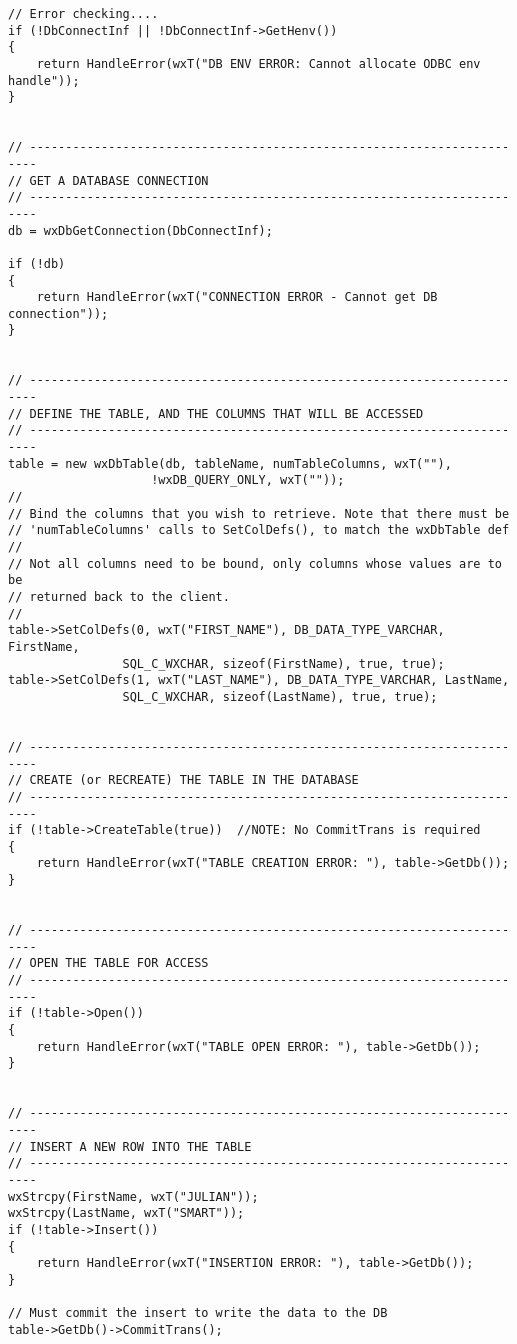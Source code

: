 \begin{verbatim}
// Error checking....
if (!DbConnectInf || !DbConnectInf->GetHenv())
{
    return HandleError(wxT("DB ENV ERROR: Cannot allocate ODBC env handle"));
}


// -----------------------------------------------------------------------
// GET A DATABASE CONNECTION
// -----------------------------------------------------------------------
db = wxDbGetConnection(DbConnectInf);

if (!db)
{
    return HandleError(wxT("CONNECTION ERROR - Cannot get DB connection"));
}


// -----------------------------------------------------------------------
// DEFINE THE TABLE, AND THE COLUMNS THAT WILL BE ACCESSED
// -----------------------------------------------------------------------
table = new wxDbTable(db, tableName, numTableColumns, wxT(""), 
                    !wxDB_QUERY_ONLY, wxT(""));
//
// Bind the columns that you wish to retrieve. Note that there must be
// 'numTableColumns' calls to SetColDefs(), to match the wxDbTable def
//
// Not all columns need to be bound, only columns whose values are to be 
// returned back to the client.
//
table->SetColDefs(0, wxT("FIRST_NAME"), DB_DATA_TYPE_VARCHAR, FirstName,
                SQL_C_WXCHAR, sizeof(FirstName), true, true);
table->SetColDefs(1, wxT("LAST_NAME"), DB_DATA_TYPE_VARCHAR, LastName,
                SQL_C_WXCHAR, sizeof(LastName), true, true);


// -----------------------------------------------------------------------
// CREATE (or RECREATE) THE TABLE IN THE DATABASE
// -----------------------------------------------------------------------
if (!table->CreateTable(true))  //NOTE: No CommitTrans is required
{
    return HandleError(wxT("TABLE CREATION ERROR: "), table->GetDb());
}


// -----------------------------------------------------------------------
// OPEN THE TABLE FOR ACCESS
// -----------------------------------------------------------------------
if (!table->Open())
{
    return HandleError(wxT("TABLE OPEN ERROR: "), table->GetDb());
}


// -----------------------------------------------------------------------
// INSERT A NEW ROW INTO THE TABLE
// -----------------------------------------------------------------------
wxStrcpy(FirstName, wxT("JULIAN"));
wxStrcpy(LastName, wxT("SMART"));
if (!table->Insert())
{
    return HandleError(wxT("INSERTION ERROR: "), table->GetDb());
}

// Must commit the insert to write the data to the DB
table->GetDb()->CommitTrans();



\end{verbatim}

